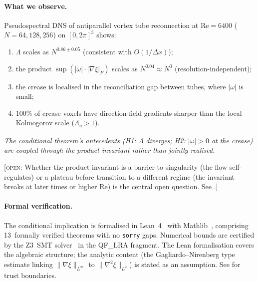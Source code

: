 \documentclass[11pt,a4paper]{article}
\theoremstyle{definition}
\newcommand{\grad}{\nabla}
\newcommand{\lapl}{\nabla^2}
\newcommand{\norm}[1]{\lVert #1 \rVert}
\newcommand{\abs}[1]{\lvert #1 \rvert}
\newcommand{\Rey}{\mathrm{Re}}
\newcommand{\weakclaim}[1]{\emph{#1}}      %
\newcommand{\openquestion}[1]{%
  \textcolor{black!70}{[\textsc{open}: #1]}}
\begin{document}
\paragraph{What we observe.}
Pseudospectral DNS of antiparallel vortex tube reconnection at
$\Rey=6400$ ($N=64,128,256$) on $[0,2\pi]^3$ shows:
\begin{enumerate}[label=(\alph*)]
  \item $\Lambda$ scales as $N^{0.86\pm0.05}$ (consistent with $O(1/\Delta x)$);
  \item the product $\sup(\abs{\omega}\cdot\abs{\grad\xi}_F)$ scales as
    $N^{0.04}\approx N^0$ (resolution-independent);
  \item the crease is localised in the reconciliation gap between
    tubes, where $\abs{\omega}$ is small;
  \item 100\% of crease voxels have direction-field gradients sharper
    than the local Kolmogorov scale ($\Lambda_\eta>1$).
\end{enumerate}
\weakclaim{The conditional theorem's antecedents (H1: $\Lambda$ diverges;
H2: $\abs{\omega}>0$ at the crease) are coupled through the product
invariant rather than jointly realised.}

\openquestion{Whether the product invariant is a barrier to singularity
(the flow self-regulates) or a plateau before transition to a different
regime (the invariant breaks at later times or higher Re) is the
central open question.  See \Cref{sec:discussion}.}

\paragraph{Formal verification.}
The conditional implication is formalised in Lean~4~\cite{Lean4} with
Mathlib~\cite{Mathlib}, comprising 13~formally verified theorems with
no \texttt{sorry} gaps.  Numerical bounds are certified by the
Z3~SMT solver~\cite{Z3} in the QF\_LRA fragment.  The Lean
formalisation covers the algebraic structure; the analytic content
(the Gagliardo--Nirenberg type estimate linking
$\norm{\grad\xi}_{L^\infty}$ to $\norm{\lapl\xi}_{L^2}$) is stated
as an assumption.  See  for trust boundaries.
\end{document}
